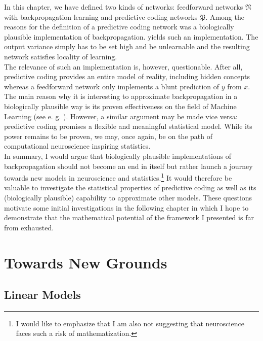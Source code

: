 \documentclass[a4paper,11pt]{report}
\begin{document}
\begin{Par}
In this chapter, we have defined two kinds of networks: feedforward networks $\mathfrak{N}$ with backpropagation learning and predictive coding networks $\mathfrak{P}$. Among the reasons for the definition of a predictive coding network was a biologically plausible implementation of backpropagation.  yields such an implementation. The output variance simply has to be set high and be unlearnable and the resulting network satisfies locality of learning.\\
The relevance of such an implementation is, however, questionable. After all, predictive coding provides an entire model of reality, including hidden concepts whereas a feedforward network only implements a blunt prediction of $y$ from $x$. The main reason why it is interesting to approximate backpropagation in a biologically plausible way is its proven effectiveness on the field of Machine Learning (see e. g. \cite{Whittington2017, Liao2015}). However, a similar argument may be made vice versa: predictive coding promises a flexible and meaningful statistical model. While its power remains to be proven, we may, once again, be on the path of computational neuroscience inspiring statistics.\\
In summary, I would argue that biologically plausible implementations of backpropagation should not become an end in itself but rather launch a journey towards new models in neuroscience and statistics.\footnote{
I would like to emphasize that I am also not suggesting that neuroscience faces such a risk of mathematization.} It would therefore be valuable to investigate the statistical properties of predictive coding as well as its (biologically plausible) capability to approximate other models. These questions motivate some initial investigations in the following chapter in which I hope to demonstrate that the mathematical potential of the framework I presented is far from exhausted.
\end{Par}

\chapter{Towards New Grounds}\label{ch:further-work}

\section{Linear Models}
\end{document}
